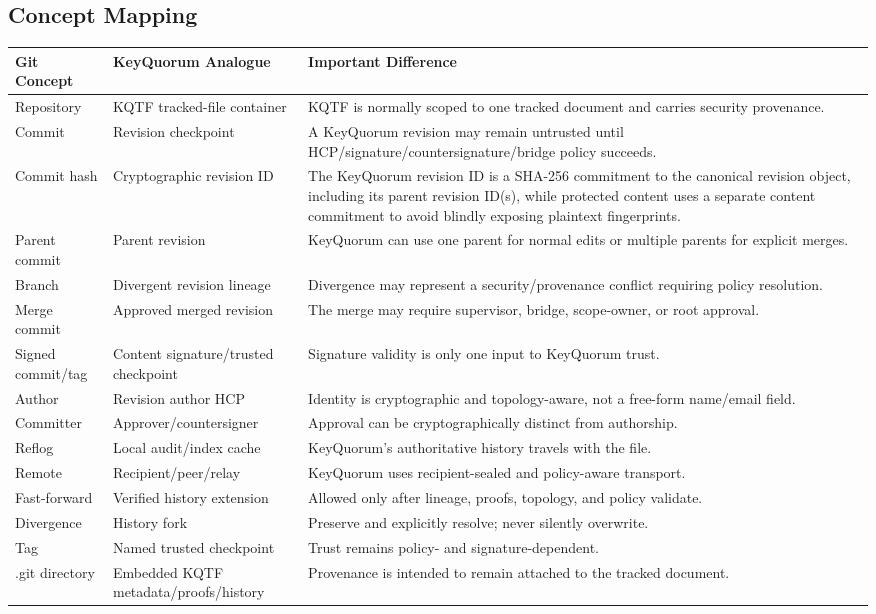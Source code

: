 \documentclass[11pt]{article}
\begin{document}
\subsection{Concept Mapping}
\begin{longtable}{>{\raggedright\arraybackslash}p{} >{\raggedright\arraybackslash}p{} >{\raggedright\arraybackslash}p{}}
\toprule
\textbf{Git Concept} & \textbf{KeyQuorum Analogue} & \textbf{Important Difference} \\
\midrule
\endhead
Repository & KQTF tracked-file container & KQTF is normally scoped to one tracked document and carries security provenance. \\
Commit & Revision checkpoint & A KeyQuorum revision may remain untrusted until HCP/signature/countersignature/bridge policy succeeds. \\
Commit hash & Cryptographic revision ID & The KeyQuorum revision ID is a SHA-256 commitment to the canonical revision object, including its parent revision ID(s), while protected content uses a separate content commitment to avoid blindly exposing plaintext fingerprints. \\
Parent commit & Parent revision & KeyQuorum can use one parent for normal edits or multiple parents for explicit merges. \\
Branch & Divergent revision lineage & Divergence may represent a security/provenance conflict requiring policy resolution. \\
Merge commit & Approved merged revision & The merge may require supervisor, bridge, scope-owner, or root approval. \\
Signed commit/tag & Content signature/trusted checkpoint & Signature validity is only one input to KeyQuorum trust. \\
Author & Revision author HCP & Identity is cryptographic and topology-aware, not a free-form name/email field. \\
Committer & Approver/countersigner & Approval can be cryptographically distinct from authorship. \\
Reflog & Local audit/index cache & KeyQuorum's authoritative history travels with the file. \\
Remote & Recipient/peer/relay & KeyQuorum uses recipient-sealed and policy-aware transport. \\
Fast-forward & Verified history extension & Allowed only after lineage, proofs, topology, and policy validate. \\
Divergence & History fork & Preserve and explicitly resolve; never silently overwrite. \\
Tag & Named trusted checkpoint & Trust remains policy- and signature-dependent. \\
.git directory & Embedded KQTF metadata/proofs/history & Provenance is intended to remain attached to the tracked document. \\
\bottomrule
\end{longtable}
\end{document}
